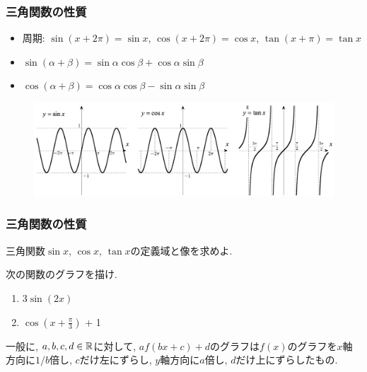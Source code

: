 \begin{frame}
\frametitle{三角関数の性質}

\begin{itemize}
\item 周期: $\sin (x + 2\pi) = \sin x$, $\cos (x + 2\pi) = \cos x$, $\tan (x +\pi) = \tan x$
\item $\sin(\alpha+\beta)=\sin \alpha \cos \beta + \cos \alpha \sin \beta$
\item $\cos(\alpha+\beta)=\cos \alpha \cos \beta - \sin \alpha \sin \beta$
\end{itemize}

\vspace{-2mm}

\begin{figure}[htbp]
 \begin{center} 
  \includegraphics[width=122mm]{calculus2/trig.png}
 \end{center}
\end{figure}
\vspace{-4mm}

\end{frame}







\begin{frame}
\frametitle{三角関数の性質}

\begin{Prob}
三角関数$\sin x$, $\cos x$, $\tan x$の定義域と像を求めよ.  
\end{Prob}

\begin{Prob}
次の関数のグラフを描け. 
\begin{enumerate}
\item $3\sin(2x)$
\item $\cos(x+\frac{\pi}{3})$ + 1
\end{enumerate}
\end{Prob}

一般に, $a,b,c,d \in \mathbb{R}$に対して, $af(bx+c)+d$のグラフは$f(x)$のグラフを$x$軸方向に$1/b$倍し, $c$だけ左にずらし, $y$軸方向に$a$倍し, $d$だけ上にずらしたもの. 
\end{frame}


